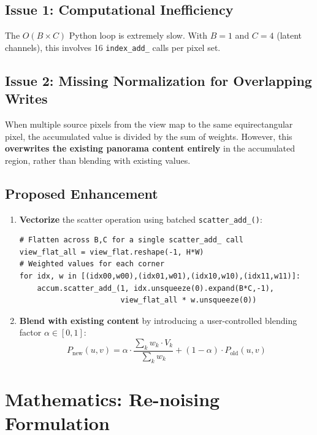 \documentclass[11pt,a4paper]{article}
\newcommand{\fn}[1]{\texttt{#1}}
\begin{document}
\subsection{Issue 1: Computational Inefficiency}

The $O(B \times C)$ Python loop is extremely slow.
With $B=1$ and $C=4$ (latent channels), this involves 16 \fn{index\_add\_} calls per pixel set.

\subsection{Issue 2: Missing Normalization for Overlapping Writes}

When multiple source pixels from the view map to the same equirectangular pixel, the accumulated value is divided by the sum of weights.
However, this \textbf{overwrites the existing panorama content entirely} in the accumulated region, rather than blending with existing values.

\subsection{Proposed Enhancement}

\begin{enumerate}
    \item \textbf{Vectorize} the scatter operation using batched \fn{scatter\_add\_()}:
\begin{lstlisting}
# Flatten across B,C for a single scatter_add_ call
view_flat_all = view_flat.reshape(-1, H*W)
# Weighted values for each corner
for idx, w in [(idx00,w00),(idx01,w01),(idx10,w10),(idx11,w11)]:
    accum.scatter_add_(1, idx.unsqueeze(0).expand(B*C,-1),
                       view_flat_all * w.unsqueeze(0))
\end{lstlisting}

    \item \textbf{Blend with existing content} by introducing a user-controlled blending factor $\alpha \in [0,1]$:
\begin{equation}
    P_{\text{new}}(u,v) = \alpha \cdot \frac{\sum_k w_k \cdot V_k}{\sum_k w_k} + (1-\alpha) \cdot P_{\text{old}}(u,v)
\end{equation}
\end{enumerate}

\section{Mathematics: Re-noising Formulation}
\end{document}
